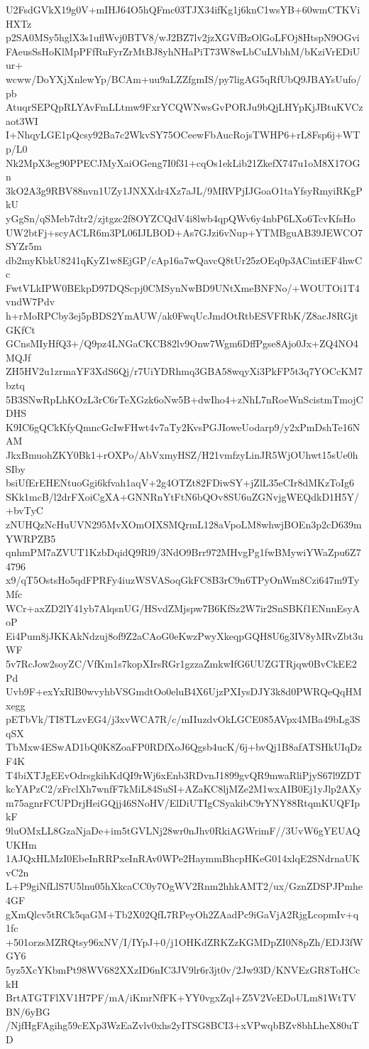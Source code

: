 U2FsdGVkX19g0V+mIHJ64O5hQFmc03TJX34ifKg1j6knC1wsYB+60wmCTKViHXTz
p2SA0MSy5hglX3s1uflWvj0BTV8/wJ2BZ7lv2jzXGVfBzOlGoLFOj8HtspN9OGvi
FAeusSsHoKlMpPFfRuFyrZrMtBJ8yhNHaPiT73W8wLbCuLVbhM/bKziVrEDiUur+
wcww/DoYXjXnlewYp/BCAm+uu9aLZZfgmIS/py7ligAG5qRfUbQ9JBAYsUufo/pb
AtuqrSEPQpRLYAvFmLLtmw9FxrYCQWNwsGvPORJu9bQjLHYpKjJBtuKVCzaot3WI
I+NhqyLGE1pQcsy92Ba7c2WkvSY75OCeewFbAucRojsTWHP6+rL8Fsp6j+WTp/L0
Nk2MpX3eg90PPECJMyXaiOGeng7I0f31+cqOs1ekLib21ZkefX747u1oM8X17OGn
3kO2A3g9RBV88nvn1UZy1JNXXdr4Xz7aJL/9MRVPjIJGoaO1taYfsyRmyiRKgPkU
yGgSn/qSMeb7dtr2/zjtgzc2f8OYZCQdV4i8lwb4qpQWv6y4nbP6LXo6TcvKfsHo
UW2btFj+scyACLR6m3PL06IJLBOD+As7GJzi6vNup+YTMBguAB39JEWCO7SYZr5m
db2myKbkU8241qKyZ1w8EjGP/cAp16a7wQavcQ8tUr25zOEq0p3ACintiEF4hwCc
FwtVLkIPW0BEkpD97DQScpj0CMSynNwBD9UNtXmeBNFNo/+WOUTOi1T4vndW7Pdv
h+rMoRPCby3ej5pBDS2YmAUW/ak0FwqUcJmdOtRtbESVFRbK/Z8acJ8RGjtGKfCt
GCnsMIyHfQ3+/Q9pz4LNGaCKCB82lv9Onw7Wgm6DffPgse8Ajo0Jx+ZQ4NO4MQJf
ZH5HV2u1zrmaYF3XdS6Qj/r7UiYDRhmq3GBA58wqyXi3PkFP5t3q7YOCcKM7bztq
5B3SNwRpLhKOzL3rC6rTeXGzk6oNw5B+dwIho4+zNhL7nRoeWnScistmTmojCDHS
K9IC6gQCkKfyQmncGcIwFHwt4v7aTy2KvsPGJIoweUodarp9/y2xPmDshTe16NAM
JkxBmuohZKY0Bk1+rOXPo/AbVxmyHSZ/H21vmfzyLinJR5WjOUhwt15sUe0hSIby
bsiUfErEHENtuoGgi6kfvah1aqV+2g4OTZt82FDiwSY+jZlL35eCIr8dMKzToIg6
SKk1mcB/l2drFXoiCgXA+GNNRnYtFtN6bQOv8SU6uZGNvjgWEQdkD1H5Y/+bvTyC
zNUHQzNcHuUVN295MvXOmOIXSMQrmL128aVpoLM8whwjBOEn3p2cD639mYWRPZB5
qnhmPM7aZVUT1KzbDqidQ9Rl9/3NdO9Brr972MHvgPg1fwBMywiYWaZpu6Z74796
x9/qT5OstsHo5qdFPRFy4iuzWSVASoqGkFC8B3rC9n6TPyOnWm8Czi647m9TyMfc
WCr+axZD2lY41yb7AlqsnUG/HSvdZMjspw7B6KfSz2W7ir2SnSBKf1ENnnEsyAoP
Ei4Pum8jJKKAkNdzuj8of9Z2aCAoG0eKwzPwyXkeqpGQH8U6g3IV8yMRvZbt3uWF
5v7RcJow2soyZC/VfKm1s7kopXIrsRGr1gzzaZmkwIfG6UUZGTRjqw0BvCkEE2Pd
Uvb9F+exYxRlB0wvyhbVSGmdtOo0eluB4X6UjzPXIysDJY3k8d0PWRQeQqHMxegg
pETbVk/TI8TLzvEG4/j3xvWCA7R/c/mIIuzdvOkLGCE085AVpx4MBa49bLg3SqSX
TbMxw4ESwAD1bQ0K8ZoaFP0RDfXoJ6Qgsb4ucK/6j+bvQj1B8afATSHkUIqDzF4K
T4biXTJgEEvOdrsgkihKdQI9rWj6xEnb3RDvnJ1899gvQR9mwaRliPjyS67l9ZDT
kcYAPzC2/zFrclXh7wnfF7kMiL84SuSI+AZaKC8ljMZe2M1wxAIB0Ej1yJlp2AXy
m75agnrFCUPDrjHeiGQjj46SNoHV/ElDiUTIgCSyakibC9rYNY88RtqmKUQFIpkF
9luOMxLL8GzaNjaDe+im5tGVLNj28wr0nJhv0RkiAGWrimF//3UvW6gYEUAQUKHm
1AJQxHLMzI0EbeInRRPxeInRAv0WPe2HaymmBhcpHKeG014xlqE2SNdrnaUKvC2n
L+P9giNfLlS7U5lnu05hXkcaCC0y7OgWV2Rnm2hhkAMT2/ux/GznZDSPJPmhe4GF
gXmQlcv5tRCk5qaGM+Tb2X02QfL7RPeyOh2ZAadPc9iGaVjA2RjgLcopmIv+q1fc
+501orzsMZRQtsy96xNV/I/IYpJ+0/j1OHKdZRKZzKGMDpZI0N8pZh/EDJ3fWGY6
5yz5XcYKbmPt98WV682XXzID6nIC3JV9lr6r3jt0v/2Jw93D/KNVEzGR8ToHCckH
BrtATGTFlXV1H7PF/mA/iKmrNfFK+YY0vgxZql+Z5V2VeEDoULm81WtTVBN/6yBG
/NjfHgFAgihg59cEXp3WzEaZvlv0xhs2yITSG8BCI3+xVPwqbBZv8bhLheX80uTD
